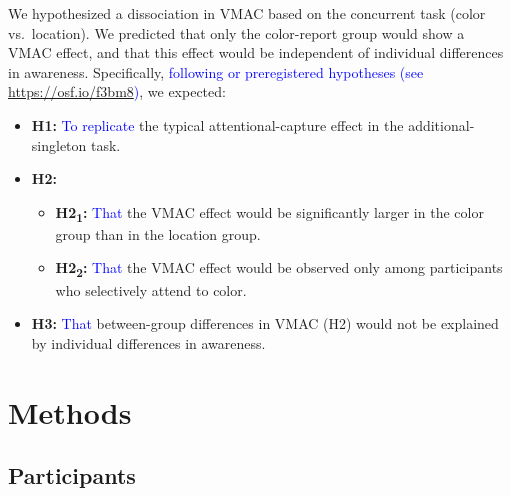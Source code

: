 \documentclass[
  man,
  floatsintext,
  longtable,
  nolmodern,
  notxfonts,
  notimes,
  mask,
  colorlinks=true,linkcolor=blue,citecolor=blue,urlcolor=blue]{apa7}
\begin{document}
We hypothesized a dissociation in VMAC based on the concurrent task
(color vs.~location). We predicted that only the color-report group
would show a VMAC effect, and that this effect would be independent of
individual differences in awareness. Specifically,
\textcolor{blue}{following or preregistered hypotheses (see
\url{https://osf.io/f3bm8})}, we expected:

\begin{itemize}
\item
  \textbf{H1:} \textcolor{blue}{To replicate} the typical
  attentional-capture effect in the additional-singleton task.
\item
  \textbf{H2:}

  \begin{itemize}
  \item
    \textbf{H2\textsubscript{1}:} \textcolor{blue}{That} the VMAC effect
    would be significantly larger in the color group than in the
    location group.
  \item
    \textbf{H2\textsubscript{2}:} \textcolor{blue}{That} the VMAC effect
    would be observed only among participants who selectively attend to
    color.
  \end{itemize}
\item
  \textbf{H3:} \textcolor{blue}{That} between-group differences in VMAC
  (H2) would not be explained by individual differences in awareness.
\end{itemize}

\section{Methods}\label{methods}

\subsection{Participants}\label{participants}
\end{document}
